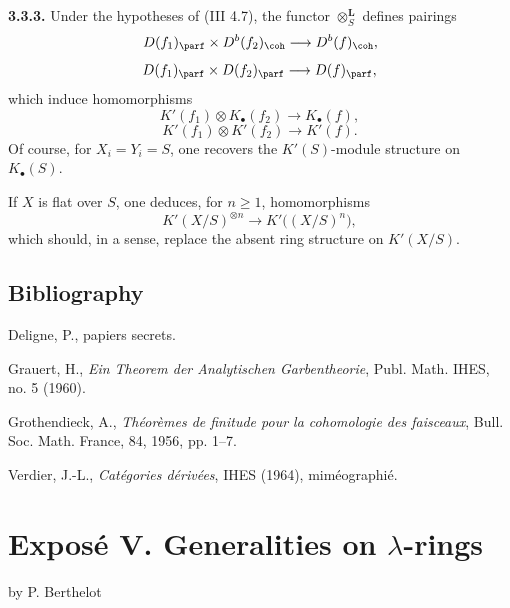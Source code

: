 \documentclass[11pt]{article}
\newcommand{\Fil}{\operatorname{Fil}}
\begin{document}
\textbf{3.3.3.} Under the hypotheses of (III 4.7), the functor \(\otimes_S^{\mathbf L}\) defines pairings
\[
 D(f_1)_{\parf}\times D^b(f_2)_{\coh}\longrightarrow D^b(f)_{\coh},
\]
\[
 D(f_1)_{\parf}\times D(f_2)_{\parf}\longrightarrow D(f)_{\parf},
\]
which induce homomorphisms
\[
 K'(f_1)\otimes K_{\bullet}(f_2)\longrightarrow K_{\bullet}(f),
\]
\[
 K'(f_1)\otimes K'(f_2)\longrightarrow K'(f).
\]
Of course, for \(X_i=Y_i=S\), one recovers the \(K'(S)\)-module structure on \(K_{\bullet}(S)\).

If \(X\) is flat over \(S\), one deduces, for \(n\geq1\), homomorphisms
\[
 K'(X/S)^{\otimes n}\longrightarrow K'\bigl((X/S)^n\bigr),
\]
which should, in a sense, replace the absent ring structure on \(K'(X/S)\).

\subsection*{Bibliography}
\begin{enumerate}[label={[\arabic*]}]
\item Deligne, P., papiers secrets.
\item Grauert, H., \emph{Ein Theorem der Analytischen Garbentheorie}, Publ. Math. IHES, no. 5 (1960).
\item Grothendieck, A., \emph{Théorèmes de finitude pour la cohomologie des faisceaux}, Bull. Soc. Math. France, 84, 1956, pp. 1--7.
\item[{[V]}] Verdier, J.-L., \emph{Catégories dérivées}, IHES (1964), miméographié.
\end{enumerate}



\providecommand{\Chat}{\widehat C}
\providecommand{\Ghat}{\widehat G}
\providecommand{\Gg}{\widehat G_g}
\providecommand{\Ga}{\widehat G_a}
\providecommand{\Grhat}{\widehat{\operatorname{Gr}}}
\providecommand{\Abfil}{\mathrm{Ab\,fil}}
\providecommand{\Kalgfil}{K\text{-}\mathrm{Alg.fil.}}
\providecommand{\Hom}{\operatorname{Hom}}
\providecommand{\Sym}{\mathfrak S}
\providecommand{\id}{\operatorname{Id}}
\providecommand{\Log}{\operatorname{Log}}
\providecommand{\Toddc}{\operatorname{Todd}}
\providecommand{\Ob}{\operatorname{Ob}}
\providecommand{\cG}{\mathcal G}
\providecommand{\cCzero}{\mathcal C_0}
\providecommand{\Fil}{\operatorname{Fil}}


\section*{Exposé V. Generalities on \(\lambda\)-rings}
\begin{center}
by P. Berthelot
\end{center}
\end{document}
